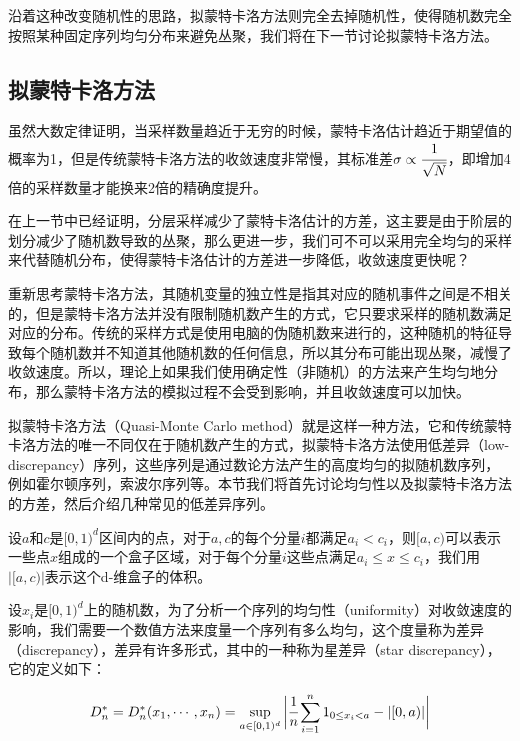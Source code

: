 沿着这种改变随机性的思路，拟蒙特卡洛方法则完全去掉随机性，使得随机数完全按照某种固定序列均匀分布来避免丛聚，我们将在下一节讨论拟蒙特卡洛方法。





\subsection{拟蒙特卡洛方法}\label{sec:quasi-monte-carlo}
虽然大数定律证明，当采样数量趋近于无穷的时候，蒙特卡洛估计趋近于期望值的概率为1，但是传统蒙特卡洛方法的收敛速度非常慢，其标准差$\sigma\propto \cfrac{1}{\sqrt{N}}$，即增加4倍的采样数量才能换来2倍的精确度提升。

在上一节中已经证明，分层采样减少了蒙特卡洛估计的方差，这主要是由于阶层的划分减少了随机数导致的丛聚，那么更进一步，我们可不可以采用完全均匀的采样来代替随机分布，使得蒙特卡洛估计的方差进一步降低，收敛速度更快呢？

重新思考蒙特卡洛方法，其随机变量的独立性是指其对应的随机事件之间是不相关的，但是蒙特卡洛方法并没有限制随机数产生的方式，它只要求采样的随机数满足对应的分布。传统的采样方式是使用电脑的伪随机数来进行的，这种随机的特征导致每个随机数并不知道其他随机数的任何信息，所以其分布可能出现丛聚，减慢了收敛速度。所以，理论上如果我们使用确定性（非随机）的方法来产生均匀地分布，那么蒙特卡洛方法的模拟过程不会受到影响，并且收敛速度可以加快。

拟蒙特卡洛方法（Quasi-Monte Carlo method）就是这样一种方法，它和传统蒙特卡洛方法的唯一不同仅在于随机数产生的方式，拟蒙特卡洛方法使用低差异（low-discrepancy）序列，这些序列是通过数论方法产生的高度均匀的拟随机数序列，例如霍尔顿序列，索波尔序列等。本节我们将首先讨论均匀性以及拟蒙特卡洛方法的方差，然后介绍几种常见的低差异序列。

设$a$和$c$是$[0,1)^d$区间内的点，对于$a,c$的每个分量$i$都满足$a_i<c_i$，则$[a,c)$可以表示一些点$x$组成的一个盒子区域，对于每个分量$i$这些点满足$a_i\leq x\leq c_i$，我们用$|[a,c)|$表示这个d-维盒子的体积。

设$x_i$是$[0,1)^d$上的随机数，为了分析一个序列的均匀性（uniformity）对收敛速度的影响，我们需要一个数值方法来度量一个序列有多么均匀，这个度量称为差异（discrepancy），差异有许多形式，其中的一种称为星差异（star discrepancy），它的定义如下：

\begin{equation}
	D^{*}_n=D^{*}_n(x_1,\cdots,x_n)=\sup_{a\in[0,1)^d}\bigg| \cfrac{1}{n}\sum^{n}_{i=1}1_{0\leq x_i<a}-|[0,a)|\bigg|
\end{equation}

